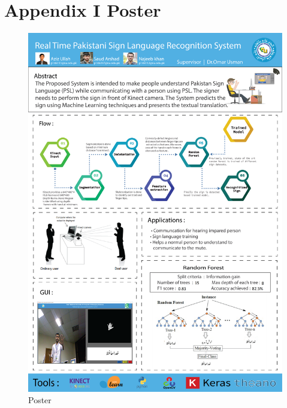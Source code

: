  \chapter{Appendix I Poster}
 
\begin{figure}[!htb]
	
	\includegraphics[width=1\columnwidth]{ThesisFigs/poster}
	\caption{Poster}\label{fig:poster}
\end{figure}
